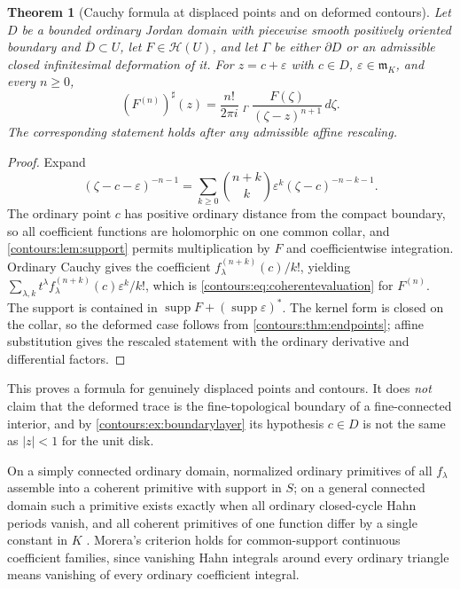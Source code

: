 \documentclass[11pt,letterpaper]{article}
\newtheorem{theorem}{Theorem}[section]
\theoremstyle{definition}
\theoremstyle{remark}
\newcommand{\HH}{\mathcal H}\newcommand{\A}{\mathscr A}\newcommand{\OO}{\mathcal O}
\newcommand{\m}{\mathfrak m}\newcommand{\st}{\operatorname{st}}
\newcommand{\supp}{\operatorname{supp}}\newcommand{\Res}{\operatorname{Res}}
\newcommand{\HCoint}{\mathop{\oint^{\!H}}\nolimits}
\newcommand{\sh}{^{\sharp}}\newcommand{\dd}{\,d}
\numberwithin{equation}{section}
\begin{document}
\begin{theorem}[Cauchy formula at displaced points and on deformed contours]
\label{contours:thm:cauchyformula}
Let $D$ be a bounded ordinary Jordan domain with piecewise smooth positively
oriented boundary and $\overline D\subset U$, let $F\in\HH(U)$, and let $\Gamma$ be
either $\partial D$ or an admissible closed infinitesimal deformation of it. For
$z=c+\varepsilon$ with $c\in D$, $\varepsilon\in\m_K$, and every $n\ge0$,
\begin{equation}\label{contours:eq:cauchyformula}
  (F^{(n)})\sh(z)=\frac{n!}{2\pi i}\HCoint_\Gamma
  \frac{F(\zeta)}{(\zeta-z)^{n+1}}\dd\zeta .
\end{equation}
The corresponding statement holds after any admissible affine rescaling.
\end{theorem}
\begin{proof}
Expand
\[
  (\zeta-c-\varepsilon)^{-n-1}
  =\sum_{k\ge0}\binom{n+k}{k}\varepsilon^k(\zeta-c)^{-n-k-1}.
\]
The ordinary point $c$ has positive ordinary distance from the compact boundary, so
all coefficient functions are holomorphic on one common collar, and
\cref{contours:lem:support} permits multiplication by $F$ and coefficientwise
integration. Ordinary Cauchy gives the coefficient $f_\lambda^{(n+k)}(c)/k!$,
yielding $\sum_{\lambda,k}t^\lambda f_\lambda^{(n+k)}(c)\varepsilon^k/k!$, which is
\eqref{contours:eq:coherentevaluation} for $F^{(n)}$. The support is contained in
$\supp F+(\supp\varepsilon)^*$. The kernel form is closed on the collar, so the
deformed case follows from \cref{contours:thm:endpoints}; affine substitution gives
the rescaled statement with the ordinary derivative and differential factors.
\end{proof}

This proves a formula for genuinely displaced points and contours. It does
\emph{not} claim that the deformed trace is the fine-topological boundary of a
fine-connected interior, and by \cref{contours:ex:boundarylayer} its hypothesis
$c\in D$ is not the same as $|z|<1$ for the unit disk.

On a simply connected ordinary domain, normalized ordinary primitives of all
$f_\lambda$ assemble into a coherent primitive with support in $S$; on a general
connected domain such a primitive exists exactly when all ordinary closed-cycle
Hahn periods vanish, and all coherent primitives of one function differ by a single
constant in $K$ \cite[\S6]{Analysis}. Morera's criterion holds for common-support
continuous coefficient families, since vanishing Hahn integrals around every
ordinary triangle means vanishing of every ordinary coefficient integral.
\end{document}
